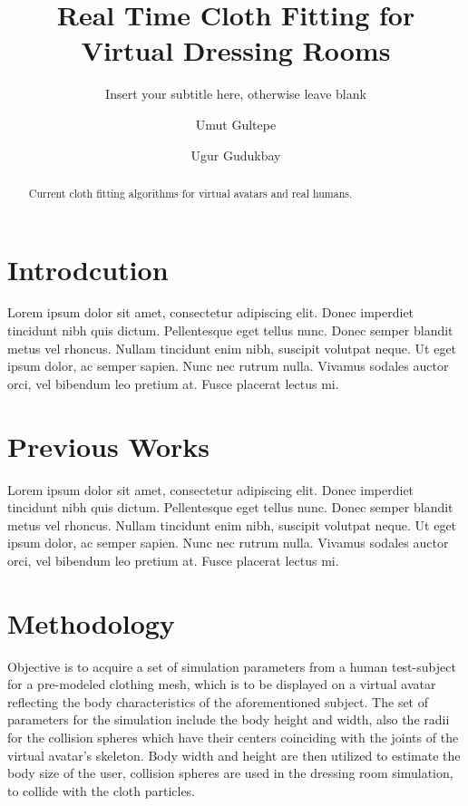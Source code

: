 \documentclass[twocolumn]{svjour3}          %
\begin{document}
\title{Real Time Cloth Fitting for Virtual Dressing Rooms }
\subtitle{Insert your subtitle here, otherwise leave blank}
\author{Umut Gultepe  \and Ugur Gudukbay}
\date{ }%

\maketitle

\begin{abstract}
Current cloth fitting algorithms for virtual avatars and real humans. 
\end{abstract}

\section{Introdcution}
\label{sec:1}
Lorem ipsum dolor sit amet, consectetur adipiscing elit. Donec imperdiet tincidunt nibh quis dictum. Pellentesque eget tellus nunc. Donec semper blandit metus vel rhoncus. Nullam tincidunt enim nibh, suscipit volutpat neque. Ut eget ipsum dolor, ac semper sapien. Nunc nec rutrum nulla. Vivamus sodales auctor orci, vel bibendum leo pretium at. Fusce placerat lectus mi.

\section{Previous Works}
\label{sec:2}
Lorem ipsum dolor sit amet, consectetur adipiscing elit. Donec imperdiet tincidunt nibh quis dictum. Pellentesque eget tellus nunc. Donec semper blandit metus vel rhoncus. Nullam tincidunt enim nibh, suscipit volutpat neque. Ut eget ipsum dolor, ac semper sapien. Nunc nec rutrum nulla. Vivamus sodales auctor orci, vel bibendum leo pretium at. Fusce placerat lectus mi.

\section{Methodology}
\label{sec:3}
Objective is to acquire a set of simulation parameters from a human test-subject for a pre-modeled clothing mesh,
 which is to be displayed on a virtual avatar reflecting the body characteristics of the aforementioned subject.
  The set of parameters for the simulation include the body height and width, also the radii for the collision 
  spheres which have their centers coinciding with the joints of the virtual avatar's skeleton. 
  Body width and height are then utilized to estimate the body size of the user, collision spheres are used 
  in the dressing room simulation, to collide with the cloth particles.   
  
\end{document}
